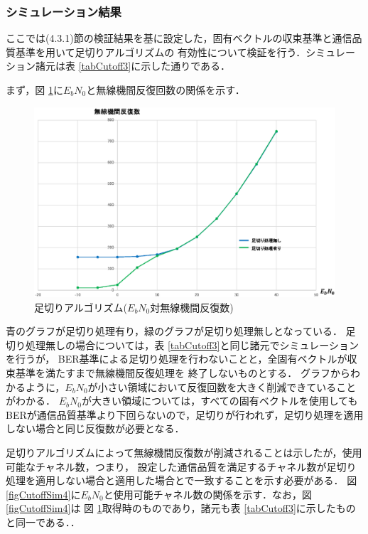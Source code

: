 \subsubsection{シミュレーション結果}
ここでは(4.3.1)節の検証結果を基に設定した，固有ベクトルの収束基準と通信品質基準を用いて足切りアルゴリズムの
有効性について検証を行う．シミュレーション諸元は表 \ref{tabCutoff3}に示した通りである．

まず，図 \ref{figCutoffSim3}に$E_bN_0$と無線機間反復回数の関係を示す．

\begin{figure}[ht]
    \centering
    \includegraphics[width=0.95\linewidth]{chapter4/figure/CutoffSim3.eps}
    \caption{足切りアルゴリズム($E_bN_0$対無線機間反復数)}
    \label{figCutoffSim3}
\end{figure}

青のグラフが足切り処理有り，緑のグラフが足切り処理無しとなっている．
足切り処理無しの場合については，表 \ref{tabCutoff3}と同じ諸元でシミュレーションを行うが，
BER基準による足切り処理を行わないことと，全固有ベクトルが収束基準を満たすまで無線機間反復処理を
終了しないものとする．
グラフからわかるように，$E_bN_0$が小さい領域において反復回数を大きく削減できていることがわかる．
$E_bN_0$が大きい領域については，すべての固有ベクトルを使用しても
BERが通信品質基準より下回らないので，足切りが行われず，足切り処理を適用しない場合と同じ反復数が必要となる．

足切りアルゴリズムによって無線機間反復数が削減されることは示したが，使用可能なチャネル数，つまり，
設定した通信品質を満足するチャネル数が足切り処理を適用しない場合と適用した場合とで一致することを示す必要がある．
図 \ref{figCutoffSim4}に$E_bN_0$と使用可能チャネル数の関係を示す．なお，図 \ref{figCutoffSim4}は
図 \ref{figCutoffSim3}取得時のものであり，諸元も表 \ref{tabCutoff3}に示したものと同一である．．

